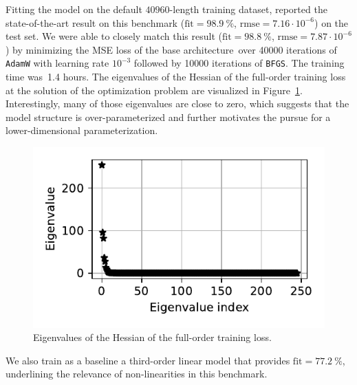 \documentclass{article}
\newcommand{\base}{{base architecture}}
\begin{document}
Fitting the model on the default $40960$-length training dataset, \cite{schoukens2021improved} reported the state-of-the-art result on this benchmark ($\mathrm{fit}=98.9~\%$, $\mathrm{rmse}=7.16\cdot 10^{-6}$) on the test set. 
We were able to closely match this result ($\mathrm{fit}=98.8~\%$, $\mathrm{rmse}=7.87\cdot 10^{-6}$) by minimizing the MSE loss
of the \base\ over 40000 iterations of \texttt{AdamW} with learning rate $10^{-3}$ followed by 10000 iterations of \texttt{BFGS}. The training time was~1.4 hours.
The eigenvalues of the Hessian of the full-order training loss at the solution of the optimization problem
are visualized in Figure~\ref{fig:boucwen_hessian}. 
Interestingly, 
many of those eigenvalues are close to zero, which suggests that the model structure is over-parameterized and further motivates the pursue for a lower-dimensional parameterization.
\begin{figure}
    \centering
    \includegraphics[width=.55\hsize]{img/hessian_eigenvalues.pdf}
    \caption{Eigenvalues of the Hessian of the full-order training loss.}
    \label{fig:boucwen_hessian}
\end{figure}

We also train as a baseline a third-order linear model that provides $\mathrm{fit}=77.2~\%$, underlining the relevance of non-linearities in this benchmark.
\end{document}
